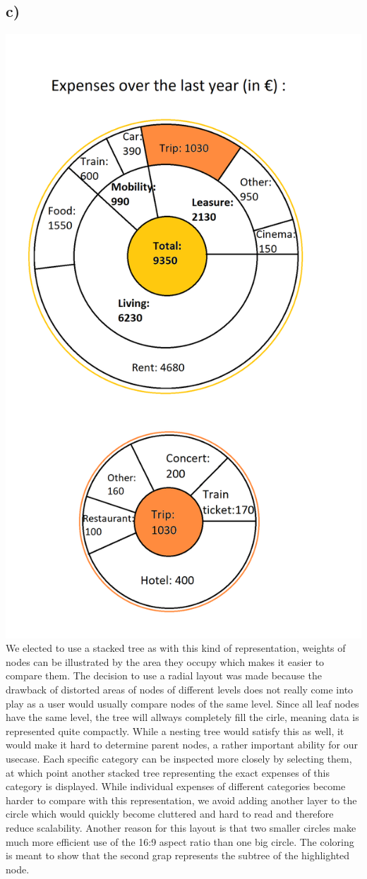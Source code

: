 \documentclass[a4paper]{article}
\begin{document}
\subsection*{c)}
\includegraphics[width=0.8\linewidth]{expenses.png}\\
We elected to use a stacked tree as with this kind of representation, weights of nodes can be illustrated by the area they occupy which makes it easier to compare them. The decision to use a radial layout was made because the drawback of distorted areas of nodes of different levels does not really come into play as a user would usually compare nodes of the same level. Since all leaf nodes have the same level, the tree will allways completely fill the cirle, meaning data is represented quite compactly. While a nesting tree would satisfy this as well, it would make it hard to determine parent nodes, a rather important ability for our usecase.
Each specific category can be inspected more closely by selecting them, at which point another stacked tree representing the exact expenses of this category is displayed. While individual expenses of different categories become harder to compare with this representation, we avoid adding another layer to the circle which would quickly become cluttered and hard to read and therefore reduce scalability. Another reason for this layout is that two smaller circles make much more efficient use of the 16:9 aspect ratio than one big circle. The coloring is meant to show that the second grap represents the subtree of the highlighted node.
\end{document}
